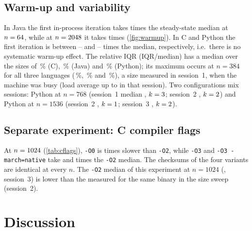 \documentclass[conference,a4paper]{IEEEtran}
\begin{document}
\subsection{Warm-up and variability}
In Java the first in-process iteration takes \JavaFirstIterMaxRel{} times the steady-state median at
$n=64$, while at $n=2048$ it takes \JavaFirstIterLargeRel{} times
(\cref{fig:warmup}). In C and Python the first iteration is between \CFirstIterRelMin{}--\CFirstIterRelMax{} and
\PythonFirstIterRelMin{}--\PythonFirstIterRelMax{} times the median, respectively, i.e.\ there is no systematic
warm-up effect. The relative IQR (IQR/median) has a median over the sizes of \RelIQRCMedian\,\% (C),
\RelIQRJavaMedian\,\% (Java) and \RelIQRPythonMedian\,\% (Python); its maximum occurs at $n=384$ for all three
languages (\RelIQRCMax\,\%, \RelIQRJavaMax\,\% and \RelIQRPythonMax\,\%), a size measured in session~1, when the
machine was busy (load average up to \SessionOneLoadMax{} in that session). Two configurations mix sessions: Python at $n=768$ (session~1 median
\MixedPythonSevenSixtyEightSessionOneMedian{}, $k=3$; session~2
\MixedPythonSevenSixtyEightSessionTwoMedian{}, $k=2$) and Python at
$n=1536$ (session~2 \MixedPythonFifteenThirtySixSessionTwoMedian{}, $k=1$;
session~3 \MixedPythonFifteenThirtySixSessionThreeMedian{}, $k=2$).



\subsection{Separate experiment: C compiler flags}
At $n=1024$ (\cref{tab:cflags}), \texttt{-O0} is \CflagsOzeroOverOtwo{} times slower than \texttt{-O2}, while
\texttt{-O3} and \texttt{-O3 -march=native} take \CflagsOthreeOverOtwo{} and \CflagsNativeOverOtwo{} times the
\texttt{-O2} median. The checksums of the four variants are identical at every $n$. The \texttt{-O2} median of this
experiment at $n=1024$ (\CflagsOtwoMedian{}, session~3) is lower than the \TCTenTwentyFour{} measured for the same
binary in the size sweep (session~2).

\section{Discussion}
\label{sec:discussion}
\end{document}
